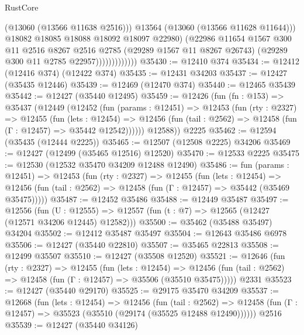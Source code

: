 \begin{lexlean}{RustCore}
\begin{coremodule}
                                (@13060 (@13566 @11638 @2516)))
                              @13564
                              (@13060 (@13566 @11628 @11644)))
                            @18082
                            @18085
                            @18088
                            @18092
                            @18097
                            @22980)
                          (@22986
                            @11654
                            @1567
                            @300
                            @11
                            @2516
                            @8267
                            @2516
                            @2785
                            (@29289 @1567 @11 @8267 @26743)
                            (@29289 @300 @11 @2785 @22957)))))))))))))
@35430 := @12410 @374
@35434 := @12412 (@12416 @374) (@12422 @374)
@35435 := @12431 @34203
@35437 := @12427 (@35435 @12446)
@35439 := @12469 (@12470 @374)
@35440 := @12465 @35439
@35442 := @12427 (@35440 @12495)
@35459 := @12426
    (fun (fn : @153) =>
    @35437
      (@12449
        (@12452
          (fun (params : @12451) =>
          @12453
            (fun (rty : @2327) =>
            @12455
              (fun (lets : @12454) =>
              @12456 (fun (tail : @2562) => @12458 (fun (Γ : @12457) => @35442 @12542))))))
        @12588))
    @2225
@35462 := @12594 (@35435 (@12444 @2225))
@35465 := @12507 (@12508 @2225) @34206
@35469 := @12427 (@12499 (@35465 @12516) @12520)
@35470 := @12533 @2225
@35475 := @12530 (@12532 @35470 @34209 @12488 @12490)
@35486 := fun (params : @12451) =>
  @12453
    (fun (rty : @2327) =>
    @12455
      (fun (lets : @12454) =>
      @12456 (fun (tail : @2562) => @12458 (fun (Γ : @12457) => @35442 (@35469 @35475)))))
@35487 := @12452 @35486
@35488 := @12449 @35487
@35497 := @12556
    (fun (U : @12555) => @12557 (fun (t : @7) => @12565 (@12427 (@12571 @34206 @12445) @12582)))
@35500 := @35462 (@35488 @35497) @34204
@35502 := @12412 @35487 @35497
@35504 := @12643 @35486 @6978
@35506 := @12427 (@35440 @22810)
@35507 := @35465 @22813
@35508 := @12499 @35507
@35510 := @12427 (@35508 @12520)
@35521 := @12646
    (fun (rty : @2327) =>
    @12455
      (fun (lets : @12454) =>
      @12456 (fun (tail : @2562) => @12458 (fun (Γ : @12457) => @35506 (@35510 @35475)))))
    @2331
@35523 := @12427 (@35440 @29170)
@35525 := @29175 @35470 @34209
@35537 := @12668
    (fun (lets : @12454) =>
    @12456
      (fun (tail : @2562) =>
      @12458 (fun (Γ : @12457) => @35523 (@35510 (@29174 (@35525 @12488 @12490))))))
    @2516
@35539 := @12427 (@35440 @34126)

\end{coremodule}
\end{lexlean}

